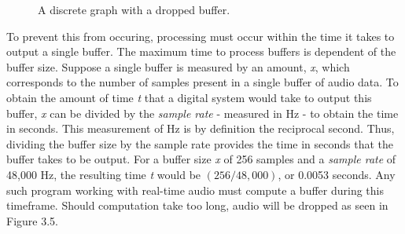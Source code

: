 \begin{figure}[h] %
	\begin{center}
		\caption{A discrete graph with a dropped buffer.}
	\end{center}
\end{figure}

To prevent this from occuring, processing must occur within the time it takes to output a single buffer. The maximum time to process buffers is dependent of the buffer size. Suppose a single buffer is measured by an amount, \textit{x}, which corresponds to the number of samples present in a single buffer of audio data. To obtain the amount of time \textit{t} that a digital system would take to output this buffer, \textit{x} can be divided by the \textit{sample rate} - measured in Hz - to obtain the time in seconds. This measurement of Hz is by definition the reciprocal second. Thus, dividing the buffer size by the sample rate provides the time in seconds that the buffer takes to be output. For a buffer size \textit{x} of 256 samples and a \textit{sample rate} of 48,000 Hz, the resulting time \textit{t} would be $(256 / 48,000)$, or 0.0053 seconds. Any such program working with real-time audio must compute a buffer during this timeframe. Should computation take too long, audio will be dropped as seen in Figure 3.5.


